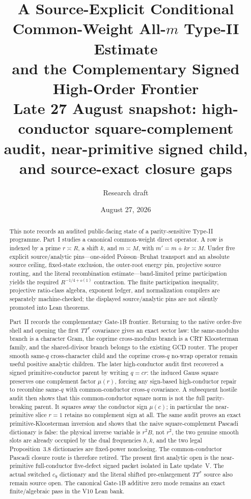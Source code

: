 \documentclass[11pt]{article}
\title{\textbf{A Source-Explicit Conditional Common-Weight All-$m$ Type-II Estimate\\
and the Complementary Signed High-Order Frontier}\\
\large Late 27 August snapshot: high-conductor square-complement audit, near-primitive signed child, and source-exact closure gaps}
\author{Research draft}
\date{August 27, 2026}
\theoremstyle{definition}
\newcommand{\1}{\mathbf 1}
\begin{document}
\maketitle

\begin{abstract}
This note records an audited public-facing state of a parity-sensitive Type-II
programme.  Part~I studies a canonical common-weight direct operator.  A row
is indexed by a prime $r\asymp R$, a shift $k$, and $m\asymp M$, with
$m'=m+kr\asymp M$.  Under five explicit source/analytic pins---one-sided
Poisson--Bruhat transport and an absolute source ceiling, fixed-state
exclusion, the outer-root energy pin, projective source routing, and the
literal recombination estimate---band-limited prime participation yields the
required $R^{-1/4+o(1)}$ contraction.  The finite participation inequality,
projective ratio-class algebra, exponent ledger, and normalization compilers
are separately machine-checked; the displayed source/analytic pins are not
silently promoted into Lean theorems.

Part~II records the complementary Gate-1B frontier.  Returning to the
native order-five shell and opening the first $TT^\ast$ covariance gives an
exact sector law: the same-modulus branch is a character Gram, the coprime
cross-modulus branch is a CRT Kloosterman family, and the shared-divisor branch
belongs to the existing GCD router.  The proper smooth same-$q$ cross-character
child and the coprime cross-$q$ no-wrap operator remain useful positive
analytic children.  The later high-conductor audit first recovered a signed
primitive-conductor parent by writing $q=cr$: the induced Gauss square preserves
one complement factor $\mu(r)$, forcing any sign-based high-conductor repair to
recombine same-$q$ with common-conductor cross-$q$ covariance.  A subsequent
hostile audit then shows that this common-conductor square norm is not the full
parity-breaking parent.  It squares away the conductor sign $\mu(c)$; in
particular the near-primitive slice $r=1$ retains no complement sign at all.
The same audit proves an exact primitive-Kloosterman inversion and shows that
the naive square-complement Pascadi dictionary is false: the physical inverse
variable is $r^2B$, not $r^2$, the two genuine smooth slots are already occupied
by the dual frequencies $h,k$, and the two legal Proposition~3.8 dictionaries
are fixed-power nonclosing.  The common-conductor Pascadi closure route is
therefore retired.  The present first analytic open is the near-primitive
full-conductor five-defect signed packet isolated in Late update~V.  The actual
switched $c_9$ dictionary and the literal shifted pre-enlargement $TT^\ast$
source also remain source open.  The canonical Gate-1B additive zero mode
remains an exact finite/algebraic pass in the V10 Lean bank.


\end{abstract}
\end{document}
